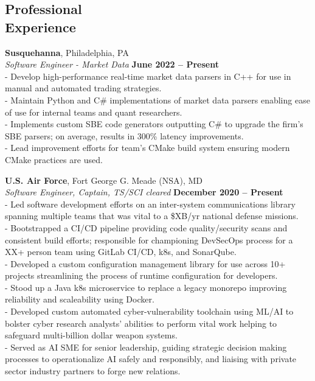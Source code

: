 \documentclass[margin,line]{resume}
\begin{document}
\begin{resume}
    \section{\mysidestyle Professional\\Experience}
    \textbf{Susquehanna}, Philadelphia, PA \vspace{2mm}\\\vspace{1mm}%
    \textsl{Software Engineer - Market Data} \hfill \textbf{June 2022 -- Present}\\
    - Develop high-performance real-time market data parsers in C++ for use in manual and automated trading strategies.\vspace{1mm}\\%
    - Maintain Python and C\# implementations of market data parsers enabling ease of use for internal teams and quant researchers.\vspace{1mm}\\%
    - Implements custom SBE code generators outputting C\# to upgrade the firm's SBE parsers; on average, results in 300\% latency improvements.\vspace{1mm}\\%
    - Lead improvement efforts for team's CMake build system ensuring modern CMake practices are used.

    \textbf{U.S. Air Force}, Fort George G. Meade (NSA), MD \vspace{2mm}\\\vspace{1mm}%
    \textsl{Software Engineer, Captain, TS/SCI cleared} \hfill \textbf{December 2020 -- Present}\\
    - Led software development efforts on an inter-system communications library spanning multiple teams that was vital to a \$XB/yr national defense missions.\vspace{1mm}\\%
    - Bootstrapped a CI/CD pipeline providing code quality/security scans and consistent build efforts; responsible for championing DevSecOps process for a XX+ person team using GitLab CI/CD, k8s, and SonarQube.\vspace{1mm}\\%
    - Developed a custom configuration management library for use across 10+ projects streamlining the process of runtime configuration for developers.\vspace{1mm}\\%
    - Stood up a Java k8s microservice to replace a legacy monorepo improving reliability and scaleability using Docker.\vspace{1mm}\\%
    - Developed custom automated cyber-vulnerability toolchain using ML/AI to bolster cyber research analysts' abilities to perform vital work helping to safeguard multi-billion dollar weapon systems.\vspace{1mm}\\%
    - Served as AI SME for senior leadership, guiding strategic decision making processes to operationalize AI safely and responsibly, and liaising with private sector industry partners to forge new relations.


\end{resume}
\end{document}
